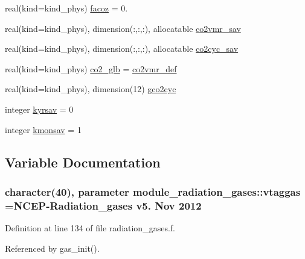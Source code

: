 \begin{DoxyCompactItemize}
\item 
real(kind=kind\+\_\+phys) \hyperlink{group__module__radiation__gases_gac7c9fd8ece69872fdef473020ea03d6b}{facoz} = 0.
\item 
real(kind=kind\+\_\+phys), dimension(\+:,\+:,\+:), allocatable \hyperlink{group__module__radiation__gases_ga4f35e5db780a64963dc65b8449def39d}{co2vmr\+\_\+sav}
\item 
real(kind=kind\+\_\+phys), dimension(\+:,\+:,\+:), allocatable \hyperlink{group__module__radiation__gases_ga3985e306e5555089909fd42a4cc93afb}{co2cyc\+\_\+sav}
\item 
real(kind=kind\+\_\+phys) \hyperlink{group__module__radiation__gases_ga0398d6837c9e8c41359e76a754147002}{co2\+\_\+glb} = \hyperlink{group__module__radiation__gases_ga4fb5ca2e3bfaed7848d7602a22499e76}{co2vmr\+\_\+def}
\item 
real(kind=kind\+\_\+phys), dimension(12) \hyperlink{group__module__radiation__gases_gac2a03ad96c9aa598f9751fd689cb615f}{gco2cyc}
\item 
integer \hyperlink{group__module__radiation__gases_ga6b4372e633bef3fb367e6ff3cf200bb8}{kyrsav} = 0
\item 
integer \hyperlink{group__module__radiation__gases_gab1cf1b63398a3e7ec0334a7c97258b4d}{kmonsav} = 1
\end{DoxyCompactItemize}


\subsection{Variable Documentation}
\subsubsection[{\texorpdfstring{vtaggas}{vtaggas}}]{\setlength{\rightskip}{0pt plus 5cm}character(40), parameter module\+\_\+radiation\+\_\+gases\+::vtaggas =\textquotesingle{}N\+C\+EP-\/Radiation\+\_\+gases v5. Nov 2012 \textquotesingle{}\hspace{0.3cm}{\ttfamily [private]}}\hypertarget{namespacemodule__radiation__gases_a8a79a6d3d931da021cd19290c58bdfaa}{}\label{namespacemodule__radiation__gases_a8a79a6d3d931da021cd19290c58bdfaa}


Definition at line 134 of file radiation\+\_\+gases.\+f.



Referenced by gas\+\_\+init().

